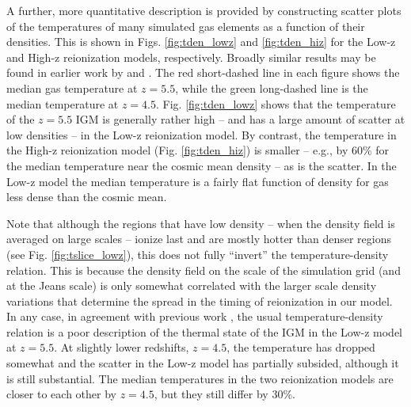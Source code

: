 A further, more quantitative description is provided by constructing 
scatter plots of the temperatures of many simulated gas elements
as a function of their densities. This is shown in Figs. \ref{fig:tden_lowz} and \ref{fig:tden_hiz} for the Low-z and
High-z reionization models, respectively. Broadly similar results may be found in earlier work by \citet{Trac:2008yz} and \citet{Furlanetto:2009kr}. The red short-dashed line in each figure shows the median gas temperature at $z=5.5$, while
the green long-dashed line is the median temperature at $z=4.5$. Fig. \ref{fig:tden_lowz}
shows that the temperature of the $z=5.5$ IGM is generally rather high -- and has a large amount of scatter at low
densities -- in the Low-z reionization model. By contrast, the temperature
in the High-z reionization model (Fig. \ref{fig:tden_hiz}) is smaller -- e.g., by 60\% for the median temperature near
the cosmic mean density  -- as is the scatter. In the Low-z model the median temperature is a fairly flat function of density
for gas less dense than the cosmic mean. 

Note that although the regions that have low density -- when the density field is averaged on large scales -- ionize last and are mostly
hotter than denser regions (see Fig. \ref{fig:tslice_lowz}), this does not fully ``invert'' the temperature-density relation. This is because the density field on the scale of the simulation grid (and at the Jeans scale) is
only somewhat correlated with the larger scale density variations that determine the spread in the timing of reionization
in our model. In any case, in agreement with previous work \citep{Trac:2008yz,Furlanetto:2009kr}, the usual temperature-density
relation is a poor description of the thermal state of the IGM in the Low-z model at $z=5.5$. 
At slightly lower redshifts, $z=4.5$, the temperature
has dropped somewhat and the scatter in the Low-z model has partially subsided, although it is still substantial. The median
temperatures in the two reionization models are closer to each other by $z=4.5$, but they still differ by 30\%. 

